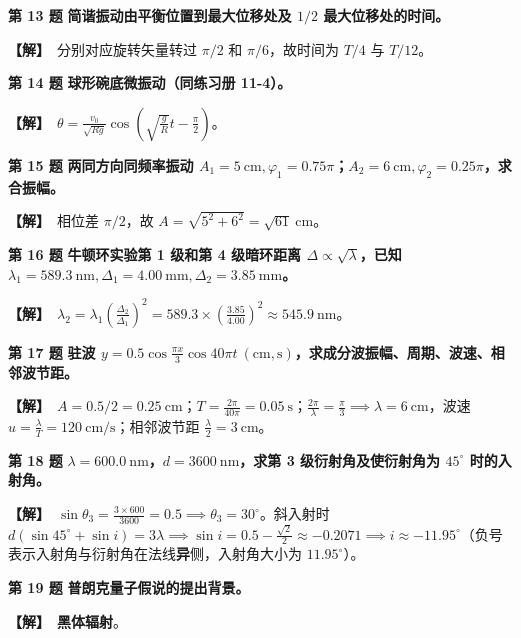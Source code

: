 \documentclass[zihao=5,a4paper,UTF8]{ctexart}
\newenvironment{prob}[2]{%
    \par\vspace{5pt}\noindent\textbf{\color{navy}#1} \textbf{#2}\par\nopagebreak\vspace{2pt}%
}{%
    \par\vspace{3pt}%
}
\newcommand{\sol}{\noindent\textbf{\color{tealaccent}【解】}\ }
\begin{document}
\begin{prob}{第 13 题}{简谐振动由平衡位置到最大位移处及 $1/2$ 最大位移处的时间。}
\sol 分别对应旋转矢量转过 $\pi/2$ 和 $\pi/6$，故时间为 \textbf{$T/4$} 与 \textbf{$T/12$}。
\end{prob}

\begin{prob}{第 14 题}{球形碗底微振动（同练习册 11-4）。}
\sol $\theta = \frac{v_0}{\sqrt{Rg}}\cos\left(\sqrt{\frac{g}{R}}t - \frac{\pi}{2}\right)$。
\end{prob}

\begin{prob}{第 15 题}{两同方向同频率振动 $A_1=5\ \mathrm{cm},\varphi_1=0.75\pi$；$A_2=6\ \mathrm{cm},\varphi_2=0.25\pi$，求合振幅。}
\sol 相位差 $\pi/2$，故 $A = \sqrt{5^2 + 6^2} = \sqrt{61}\ \mathrm{cm}$。
\end{prob}

\begin{prob}{第 16 题}{牛顿环实验第 1 级和第 4 级暗环距离 $\Delta \propto \sqrt{\lambda}$，已知 $\lambda_1=589.3\ \mathrm{nm}, \Delta_1=4.00\ \mathrm{mm}, \Delta_2=3.85\ \mathrm{mm}$。}
\sol $\lambda_2 = \lambda_1\left(\frac{\Delta_2}{\Delta_1}\right)^2 = 589.3\times\left(\frac{3.85}{4.00}\right)^2 \approx 545.9\ \mathrm{nm}$。
\end{prob}

\begin{prob}{第 17 题}{驻波 $y = 0.5\cos\frac{\pi x}{3}\cos 40\pi t\ (\mathrm{cm,s})$，求成分波振幅、周期、波速、相邻波节距。}
\sol $A = 0.5/2 = 0.25\ \mathrm{cm}$；$T = \frac{2\pi}{40\pi} = 0.05\ \mathrm{s}$；$\frac{2\pi}{\lambda} = \frac{\pi}{3} \implies \lambda = 6\ \mathrm{cm}$，波速 $u = \frac{\lambda}{T} = 120\ \mathrm{cm/s}$；相邻波节距 $\frac{\lambda}{2} = 3\ \mathrm{cm}$。
\end{prob}

\begin{prob}{第 18 题}{$\lambda=600.0\ \mathrm{nm}$，$d=3600\ \mathrm{nm}$，求第 3 级衍射角及使衍射角为 $45^\circ$ 时的入射角。}
\sol $\sin\theta_3 = \frac{3\times 600}{3600} = 0.5 \implies \theta_3 = 30^\circ$。斜入射时 $d(\sin 45^\circ + \sin i) = 3\lambda \implies \sin i = 0.5 - \frac{\sqrt{2}}{2} \approx -0.2071 \implies i \approx -11.95^\circ$（负号表示入射角与衍射角在法线\textbf{异}侧，入射角大小为 $11.95^\circ$）。
\end{prob}

\begin{prob}{第 19 题}{普朗克量子假说的提出背景。}
\sol \textbf{黑体辐射}。
\end{prob}
\end{document}
